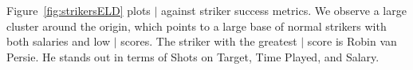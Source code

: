 {	 Figure~\ref{fig:strikersELD} plots $\mid$ against striker success metrics. We observe a large cluster around the origin, which points to a large base of normal strikers with both salaries and low $\mid$ scores. The striker with the greatest $\mid$ score is Robin van Persie. He stands out in terms of Shots on Target, Time Played, and Salary. 
	 


	\begin{figure}
		\centering     %

\end{figure}}
